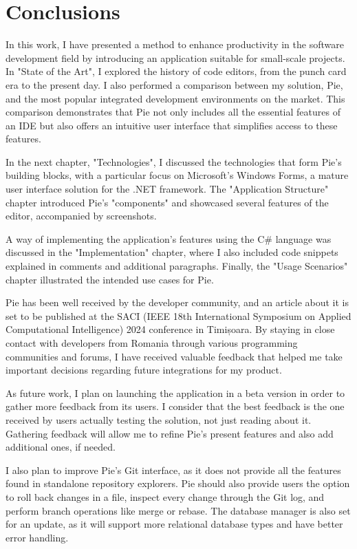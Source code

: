 \chapter{Conclusions}
\thispagestyle{pagestyle}

In this work, I have presented a method to enhance productivity in the software development field by introducing an application suitable for small-scale projects. In "State of the Art", I explored the history of code editors, from the punch card era to the present day. I also performed a comparison between my solution, Pie, and the most popular integrated development environments on the market. This comparison demonstrates that Pie not only includes all the essential features of an IDE but also offers an intuitive user interface that simplifies access to these features.

In the next chapter, "Technologies", I discussed the technologies that form Pie's building blocks, with a particular focus on Microsoft's Windows Forms, a mature user interface solution for the .NET framework. The "Application Structure" chapter introduced Pie's "components" and showcased several features of the editor, accompanied by screenshots.

A way of implementing the application's features using the C\# language was discussed in the "Implementation" chapter, where I also included code snippets explained in comments and additional paragraphs. Finally, the "Usage Scenarios" chapter illustrated the intended use cases for Pie.

Pie has been well received by the developer community, and an article about it is set to be published at the SACI (IEEE 18th International Symposium on Applied Computational Intelligence) 2024 conference in Timișoara. By staying in close contact with developers from Romania through various programming communities and forums, I have received valuable feedback that helped me take important decisions regarding future integrations for my product.

As future work, I plan on launching the application in a beta version in order to gather more feedback from its users. I consider that the best feedback is the one received by users actually testing the solution, not just reading about it. Gathering feedback will allow me to refine Pie's present features and also add additional ones, if needed.

I also plan to improve Pie's Git interface, as it does not provide all the features found in standalone repository explorers. Pie should also provide users the option to roll back changes in a file, inspect every change through the Git log, and perform branch operations like merge or rebase. The database manager is also set for an update, as it will support more relational database types and have better error handling.